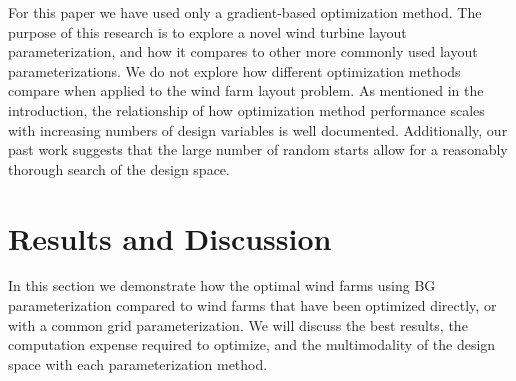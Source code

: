 \documentclass[wes, manuscript]{copernicus}
\begin{document}
For this paper we have used only a gradient-based optimization method. The purpose of this research is to explore a novel wind turbine layout parameterization, and how it compares to other more commonly used layout parameterizations. We do not explore how different optimization methods compare when applied to the wind farm layout problem. As mentioned in the introduction, the relationship of how optimization method performance scales with increasing numbers of design variables is well documented.
%
Additionally, our past work suggests that the large number of random starts allow for a reasonably thorough search of the design space.


\section{Results and Discussion}
\label{results}
In this section we demonstrate how the optimal wind farms using BG parameterization compared to wind farms that have been optimized directly, or with a common grid parameterization. We will discuss the best results, the computation expense required to optimize, and the multimodality of the design space with each parameterization method.
\end{document}
